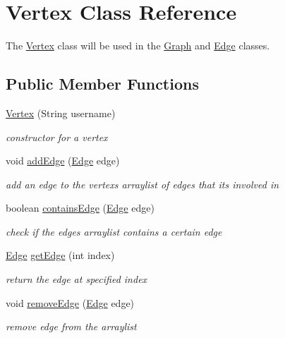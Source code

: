\hypertarget{class_vertex}{}\section{Vertex Class Reference}
\label{class_vertex}


The \hyperlink{class_vertex}{Vertex} class will be used in the \hyperlink{class_graph}{Graph} and \hyperlink{class_edge}{Edge} classes.  


\subsection*{Public Member Functions}
\begin{DoxyCompactItemize}
\item 
\hyperlink{class_vertex_a55f0a6d7d075b9d1881ebaaea3859970}{Vertex} (String username)
\begin{DoxyCompactList}\small\item\em constructor for a vertex \end{DoxyCompactList}\item 
void \hyperlink{class_vertex_a77dbe86276566b77bdb2d631472660cf}{add\+Edge} (\hyperlink{class_edge}{Edge} edge)
\begin{DoxyCompactList}\small\item\em add an edge to the vertex\textquotesingle{}s arraylist of edges that its involved in \end{DoxyCompactList}\item 
boolean \hyperlink{class_vertex_a4a77d1c66be46bef636154798bb3b96d}{contains\+Edge} (\hyperlink{class_edge}{Edge} edge)
\begin{DoxyCompactList}\small\item\em check if the edges arraylist contains a certain edge \end{DoxyCompactList}\item 
\hyperlink{class_edge}{Edge} \hyperlink{class_vertex_a428fe1ef66c8422b3af1aa4566360f13}{get\+Edge} (int index)
\begin{DoxyCompactList}\small\item\em return the edge at specified index \end{DoxyCompactList}\item 
void \hyperlink{class_vertex_a74032add8df85233c3979374471a3141}{remove\+Edge} (\hyperlink{class_edge}{Edge} edge)
\begin{DoxyCompactList}\small\item\em remove edge from the arraylist \end{DoxyCompactList}\item 

\end{DoxyCompactItemize}
